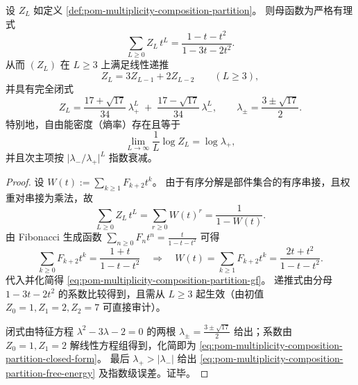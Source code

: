 \begin{proposition}\label{prop:pom-multiplicity-composition-partition-rational}
设 \(Z_L\) 如定义 \ref{def:pom-multiplicity-composition-partition}。
则母函数为严格有理式
\begin{equation}\label{eq:pom-multiplicity-composition-partition-gf}
\boxed{\;
\sum_{L\ge 0} Z_L\,t^L=\frac{1-t-t^2}{1-3t-2t^2}.\;}
\end{equation}
从而 \((Z_L)\) 在 \(L\ge 3\) 上满足线性递推
\[
\boxed{\;
Z_L=3Z_{L-1}+2Z_{L-2}\qquad(L\ge 3),\;}
\]
并具有完全闭式
\begin{equation}\label{eq:pom-multiplicity-composition-partition-closed-form}
\boxed{\;
Z_L=\frac{17+\sqrt{17}}{34}\,\lambda_+^{L}
\;+\;
\frac{17-\sqrt{17}}{34}\,\lambda_-^{L},\qquad
\lambda_\pm=\frac{3\pm\sqrt{17}}{2}.\;}
\end{equation}
特别地，自由能密度（熵率）存在且等于
\begin{equation}\label{eq:pom-multiplicity-composition-partition-free-energy}
\boxed{\;
\lim_{L\to\infty}\frac1L\log Z_L=\log\lambda_+,\;}
\end{equation}
并且次主项按 \(\bigl|\lambda_-/\lambda_+\bigr|^L\) 指数衰减。
\end{proposition}
\begin{proof}
设
\(
W(t):=\sum_{k\ge 1}F_{k+2}t^k
\)。
由于有序分解是部件集合的有序串接，且权重对串接为乘法，故
\[
\sum_{L\ge 0} Z_L\,t^L
=\sum_{r\ge 0} W(t)^r
=\frac{1}{1-W(t)}.
\]
由 Fibonacci 生成函数
\(
\sum_{n\ge 0}F_n t^n=\frac{t}{1-t-t^2}
\)
可得
\[
\sum_{k\ge 0}F_{k+2}t^k=\frac{1+t}{1-t-t^2}
\quad\Longrightarrow\quad
W(t)=\sum_{k\ge 1}F_{k+2}t^k=\frac{2t+t^2}{1-t-t^2}.
\]
代入并化简得 \eqref{eq:pom-multiplicity-composition-partition-gf}。
递推式由分母 \(1-3t-2t^2\) 的系数比较得到，且需从 \(L\ge 3\) 起生效（由初值 \(Z_0=1,Z_1=2,Z_2=7\) 可直接审计）。
\par
闭式由特征方程
\(
\lambda^2-3\lambda-2=0
\)
的两根 \(\lambda_\pm=\frac{3\pm\sqrt{17}}{2}\) 给出；系数由 \(Z_0=1,Z_1=2\) 解线性方程组得到，化简即为 \eqref{eq:pom-multiplicity-composition-partition-closed-form}。
最后 \(\lambda_+>|\lambda_-|\) 给出 \eqref{eq:pom-multiplicity-composition-partition-free-energy} 及指数级误差。证毕。
\end{proof}

